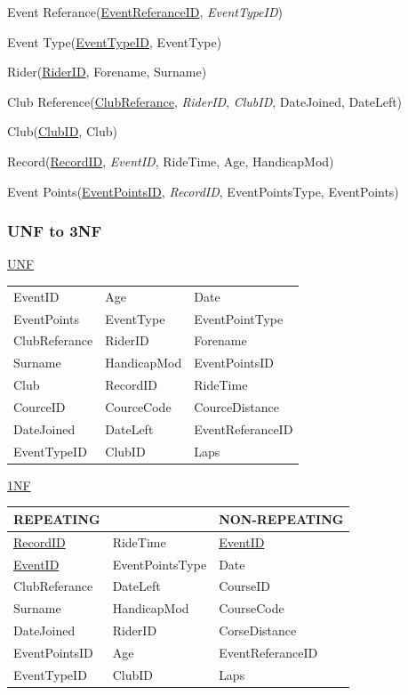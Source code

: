 Event Referance(\underline{EventReferanceID}, \emph{EventTypeID})

Event Type(\underline{EventTypeID}, EventType)

Rider(\underline{RiderID}, Forename, Surname)

Club Reference(\underline{ClubReferance}, \emph{RiderID}, \emph{ClubID}, DateJoined, DateLeft)

Club(\underline{ClubID}, Club)

Record(\underline{RecordID}, \emph{EventID}, RideTime, Age, HandicapMod)

Event Points(\underline{EventPointsID}, \emph{RecordID}, EventPointsType, EventPoints)

\subsubsection{UNF to 3NF}
\underline{UNF}


\begin{tabular}{l l l}
EventID        & Age              & Date               \\
EventPoints    & EventType        & EventPointType     \\
ClubReferance  & RiderID          & Forename           \\
Surname        & HandicapMod      & EventPointsID      \\
Club           & RecordID         & RideTime           \\
CourceID       & CourceCode       & CourceDistance     \\
DateJoined     & DateLeft         & EventReferanceID   \\
EventTypeID    & ClubID           & Laps               \\

\end{tabular}

\underline{1NF}

\begin{tabular}{|l l|l|}
\hline
REPEATING           &                 & NON-REPEATING       \\ \hline
\underline{RecordID}& RideTime        & \underline{EventID} \\ \hline
\underline{EventID} & EventPointsType & Date                \\ \hline
ClubReferance       & DateLeft        & CourseID            \\ \hline
Surname             & HandicapMod     & CourseCode          \\ \hline
DateJoined          & RiderID         & CorseDistance       \\ \hline 
EventPointsID       & Age             & EventReferanceID    \\ \hline
EventTypeID         & ClubID          & Laps                \\ \hline
\end{tabular}




